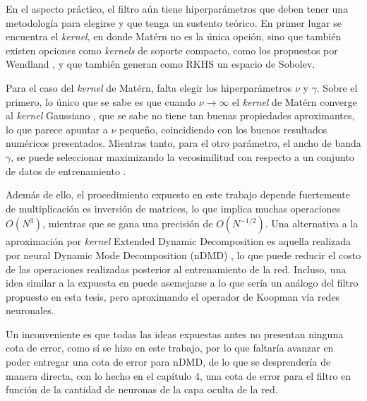 En el aspecto práctico, el filtro aún tiene hiperparámetros que deben tener una metodología para elegirse y que tenga un sustento teórico. En primer lugar se encuentra el \textit{kernel}, en donde Matérn no es la única opción, sino que también existen opciones como \textit{kernels} de soporte compacto, como los propuestos por Wendland \cite{Wendland1995PiecewiseDegree}, y que también generan como RKHS un espacio de Sobolev.

Para el caso del \textit{kernel} de Matérn, falta elegir los hiperparámetros $\nu$ y $\gamma$. Sobre el primero, lo único que se sabe es que cuando $\nu \to \infty$ el \textit{kernel} de Matérn converge al \textit{kernel} Gaussiano \cite{Rasmussen2005GaussianLearning}, que se sabe no tiene tan buenas propiedades aproximantes, lo que parece apuntar a $\nu$ pequeño, coincidiendo con los buenos resultados numéricos presentados. Mientras tanto, para el otro parámetro, el ancho de banda $\gamma$, se puede seleccionar maximizando la verosimilitud con respecto a un conjunto de datos de entrenamiento \cite{Rasmussen2005GaussianLearning}.

Además de ello, el procedimiento expuesto en este trabajo depende fuertemente de multiplicación es inversión de matrices, lo que implica muchas operaciones $O(N^3)$, mientras que se gana una precisión de $O(N^{-1/2})$. Una alternativa a la aproximación por \textit{kernel} Extended Dynamic Decomposition es aquella realizada por neural Dynamic Mode Decomposition (nDMD) \cite{Xiong2024KoopmanEquations, Frion2023LeveragingData, Terao2021ExtendedEquations}, lo que puede reducir el costo de las operaciones realizadas posterior al entrenamiento de la red. Incluso, una idea similar a la expuesta en \cite{Li2022Data-DrivenNetworks, Liu2024NeuralSystems, Garmaev2024DeepModelling} puede asemejarse a lo que sería un análogo del filtro propuesto en esta tesis, pero aproximando el operador de Koopman vía redes neuronales. 

Un inconveniente es que todas las ideas expuestas antes no presentan ninguna cota de error, como sí se hizo en este trabajo, por lo que faltaría avanzar en poder entregar una cota de error para nDMD, de lo que se desprendería de manera directa, con lo hecho en el capítulo 4, una cota de error para el filtro en función de la cantidad de neuronas de la capa oculta de la red.